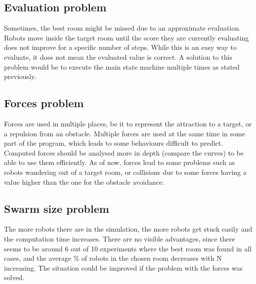 \subsection{Evaluation problem}

Sometimes, the best room might be missed due to an approximate evaluation.
Robots move inside the target room until the score they are currently evaluating
does not improve for a specific number of steps. While this is an easy way to
evaluate, it does not mean the evaluated value is correct. A solution to this
problem would be to execute the main state machine multiple times as stated
previously.

\subsection{Forces problem}

Forces are used in multiple places, be it to represent the attraction to a
target, or a repulsion from an obstacle. Multiple forces are used at the same
time in some part of the program, which leads to some behaviours difficult to
predict. Computed forces should be analysed more in depth (compare the curves)
to be able to use them efficiently. As of now, forces lead to some problems such
as robots wandering out of a target room, or collisions due to some forces
having a value higher than the one for the obstacle avoidance.

\subsection{Swarm size problem}

The more robots there are in the simulation, the more robots get stuck easily
and the computation time increases. There are no visible advantages, since
there seems to be around 6 out of 10 experiments where the best room was found
in all cases, and the average \% of robots in the chosen room decreases with N
increasing. The situation could be improved if the problem with the forces was
solved.

